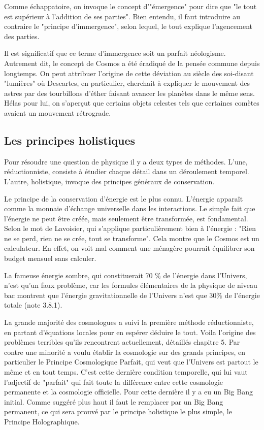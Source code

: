 \documentclass[a4paper,12pt]{article}
\begin{document}
    Comme échappatoire, on invoque le concept d'"émergence" pour dire que "le tout est supérieur à l'addition de ses parties". Bien entendu, il faut introduire au contraire le "principe d'immergence", selon lequel, le tout explique l'agencement des parties. 

    Il est significatif que ce terme d'immergence soit un parfait néologisme. Autrement dit, le concept de Cosmos a été éradiqué de la pensée commune depuis longtemps. On peut attribuer l'origine de cette déviation au siècle des soi-disant "lumières" où Descartes, en particulier, cherchait à expliquer le mouvement des astres par des tourbillons d'éther faisant avancer les planètes dans le même sens. Hélas pour lui, on s'aperçut que certains objets celestes tels que certaines comètes avaient un mouvement rétrograde.


\subsection{Les principes holistiques}

Pour résoudre une question de physique il y a deux types de méthodes. L'une, réductionniste, consiste à étudier chaque détail dans un déroulement temporel. L'autre, holistique, invoque des principes généraux de conservation.

Le principe de la conservation d'énergie est le plus connu. L'énergie apparaît comme la monnaie d'échange universelle dans les interactions. Le simple fait que l'énergie ne peut être créée, mais seulement être transformée, est fondamental. Selon le mot de Lavoisier, qui s'applique particulièrement bien à l'énergie : "Rien ne se perd, rien ne se crée, tout se transforme". Cela montre que le Cosmos est un calculateur.  En effet, on voit mal comment une ménagère pourrait équilibrer son budget mensuel sans calculer.

La fameuse énergie sombre, qui constituerait 70 \% de l'énergie dans l'Univers, n'est qu'un faux problème, car les formules élémentaires de la physique de niveau bac montrent que l'énergie gravitationnelle de l'Univers n'est que 30\% de l'énergie totale (note 3.8.1). 

La grande majorité des cosmologues a suivi la première méthode réductionniste, en partant d'équations locales pour en espérer déduire le tout. Voila l'origine des problèmes terribles qu'ils rencontrent actuellement, détaillés chapitre 5. Par contre une minorité a voulu établir la cosmologie sur des grands principes, en particulier le Principe Cosmologique Parfait, qui veut que l'Univers est partout le même et en tout temps. C'est cette dernière condition temporelle, qui lui vaut l'adjectif de "parfait" qui fait toute la différence entre cette cosmologie permanente et la cosmologie officielle. Pour cette dernière il y a eu un Big Bang initial. Comme suggéré plus haut il faut le remplacer par un Big Bang permanent, ce qui sera prouvé par le principe holistique le plus simple, le Principe Holographique.
\end{document}
